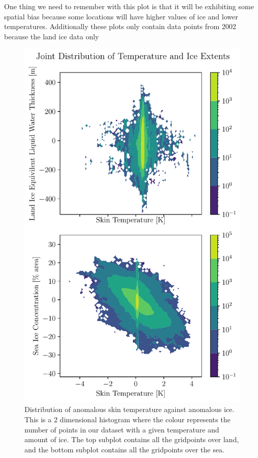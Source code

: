 \documentclass[../main.tex]{subfiles}
\begin{document}
One thing we need to remember with this plot is that it will be exhibiting some spatial bias because some locations will have higher values of ice and lower temperatures. Additionally these plots only contain data points from 2002 because the land ice data only 

\begin{figure}[h!]
    \centering
    \includegraphics{images/week8/hres/distribution_of_temperature_ice_anomalous}
    \caption{Distribution of anomalous  skin temperature against anomalous ice. This is a 2 dimensional histogram where the colour represents the number of points in our dataset with a given temperature and amount of ice. The top subplot contains all the gridpoints over land, and the bottom subplot contains all the gridpoints over the sea.}
    \label{fig:joint_distribuition_temp_ice}
\end{figure}
\end{document}
